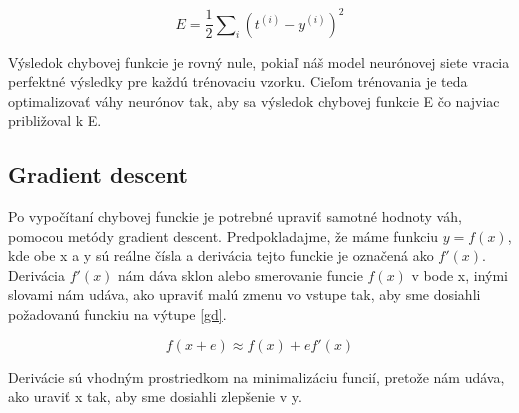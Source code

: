 \begin{equation}\label{eqn:learning}
E = \frac{1}{2} \sum \nolimits_{i} (t^{(i)} - y^{(i)})^2
\end{equation}

Výsledok chybovej funkcie je rovný nule, pokiaľ náš model neurónovej siete vracia perfektné výsledky pre každú trénovaciu vzorku.
Cieľom trénovania je teda optimalizovať váhy neurónov tak, aby sa výsledok chybovej funkcie E čo najviac približoval k E. 

\subsection{Gradient descent}
Po vypočítaní chybovej funckie je potrebné upraviť samotné hodnoty váh, pomocou metódy gradient descent.
Predpokladajme, že máme funkciu $y = f(x)$, kde obe x a y sú reálne čísla a derivácia tejto funckie je označená
ako $f'(x)$.
Derivácia $f'(x)$ nám dáva sklon alebo smerovanie funcie $f(x)$ v bode x, inými slovami nám udáva, ako upraviť
malú zmenu vo vstupe tak, aby sme dosiahli požadovanú funckiu na výtupe \eqref{gd}. \cite{goodfellow2016deep}

\begin{equation}\label{eqn:gd}
f(x + e) \approx f(x) + ef'(x)
\end{equation}

Derivácie sú vhodným prostriedkom na minimalizáciu funcií, pretože nám udáva, ako uraviť x tak, aby sme dosiahli zlepšenie v y.  



